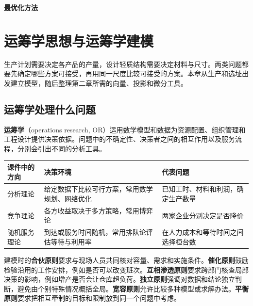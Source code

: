 \documentclass[UTF8,fontset=none,zihao=-4,a4paper]{ctexart}
\newcommand{\term}[1]{\textbf{#1}}
\begin{document}
\begin{titlepage}
\thispagestyle{empty}
\vspace*{0.28\textheight}
\begin{center}
{\fontsize{36}{45}\selectfont\bfseries 最优化方法}
\end{center}
\end{titlepage}
\thispagestyle{empty}
\tableofcontents
\clearpage
{}

\section{运筹学思想与运筹学建模}\label{sec:model}
生产计划需要决定各产品的产量，设计轻质结构需要决定材料与尺寸。两类问题都要先确定哪些方案可接受，再用同一尺度比较可接受的方案。本章从生产和选址出发建立模型，随后整理第二章所需的向量、投影和微分工具。

\subsection{运筹学处理什么问题}
\term{运筹学}（operations research, OR）运用数学模型和数据为资源配置、组织管理和工程设计提供决策依据。问题中的不确定性、决策者之间的相互作用以及服务流程，分别会引出不同的分析工具。

\begin{center}
\begin{tabularx}{\linewidth}{l Y Y}
\toprule
课件中的方向 & 决策环境 & 代表问题\\
\midrule
分析理论 & 给定数据下比较可行方案，常用数学规划、网络优化 & 已知工时、材料和利润，确定生产数量\\
竞争理论 & 各方收益取决于多方策略，常用博弈论 & 两家企业分别决定是否降价\\
随机服务理论 & 到达或服务时间随机，常用排队论评估等待与利用率 & 在人力成本和等待时间之间选择柜台数\\
\bottomrule
\end{tabularx}
\end{center}

建模时的\term{合伙原则}要求与现场人员共同核对容量、需求和实施条件。\term{催化原则}鼓励检验沿用的工作安排，例如是否可以改变班次。\term{互相渗透原则}要求跨部门核查局部决策的影响，例如增产是否会让仓库超负荷。\term{独立原则}强调对数据和结论独立判断，避免由个别特殊情况概括全局。\term{宽容原则}允许比较多种模型或求解办法。\term{平衡原则}要求把相互牵制的目标和限制放到同一个问题中考虑。
\end{document}
